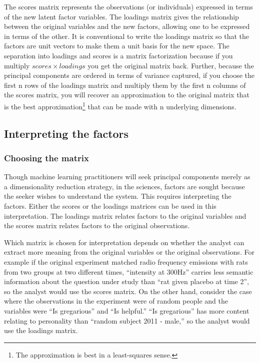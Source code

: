 The scores matrix represents the observations (or individuals) expressed in 
terms of the new latent factor variables. The loadings matrix gives the 
relationship between the original variables and the new factors, allowing one 
to be expressed in terms of the other. It is conventional to write the loadings 
matrix so that the factors are unit vectors to make them a unit basis for the 
new space. The separation into loadings and scores is a matrix factorization 
because if you multiply $scores \times loadings$ you get the original matrix 
back. Further, because the principal components are ordered in terms of variance 
captured, if you choose the first n rows of the loadings matrix and multiply 
them by the first n columns of the scores matrix, you will recover an 
approximation to the original matrix that is the best approximation\footnote{The 
approximation is best in a least-squares sense.} that can be made with n 
underlying dimensions.

\subsection{Interpreting the factors}

\subsubsection{Choosing the matrix}
Though machine learning practitioners will seek principal components merely as 
a dimensionality reduction strategy, in the sciences, factors are sought 
because the seeker wishes to understand the system. This requires interpreting
the factors. Either the scores or the loadings matrices can be used in this 
interpretation. The loadings matrix relates factors to the original variables
and the scores matrix relates factors to the original observations. 

Which matrix is chosen for interpretation depends on whether the analyst can 
extract more meaning from the original variables or the original observations. 
For example if the original experiment matched radio frequency emissions with 
rats from two groups at two different times, ``intensity at 300Hz'' carries less 
semantic information about the question under study than ``rat given placebo at 
time 2'', so the analyst would use the scores matrix. On the other hand, consider 
the case where the observations in the experiment were of random people and the 
variables were ``Is gregarious'' and ``Is helpful.'' ``Is gregarious'' has more 
content relating to personality than ``random subject 2011 - male,'' so the 
analyst would use the loadings matrix.

